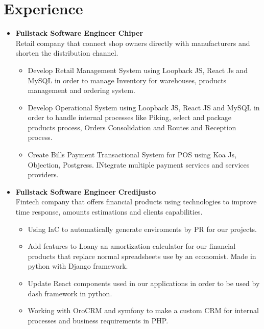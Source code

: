 \documentclass[]{friggeri-cv}
\renewenvironment{entrylist}{%
  \begin{itemize}[leftmargin=0.25in,align=left,itemindent=-\dimexpr\labelindent\relax]
}{%
  \end{itemize}
}
\renewcommand{\entry}[4]{%
  \item[#1] 
    \textbf{#2}%
    \hfill%
    {\footnotesize\textbf{\addfontfeature{Color=pblue} #3 }}\\%
    #4\vspace{\parsep}%
  }
\begin{document}
\section{Experience}
\begin{entrylist}


  \entry	
    {09/19 - 03/19}
    {Fullstack Software Engineer}
    {Chiper}
    {Retail company that connect shop owners directly with manufacturers and shorten the distribution channel.\vspace{-1mm}
    \begin{itemize}[label=$•$]
    \addtolength{\itemindent}{-4mm}
    	\item Develop Retail Management System using Loopback JS, React Js and MySQL in order to manage Inventory for warehouses, products management and ordering system.
    	\item Develop Operational System using Loopback JS, React JS and MySQL in order to handle internal processes like Piking, select and package products process, Orders Consolidation and Routes and Reception process.
    	\item Create Bills  Payment Transactional System for POS using Koa Js, Objection, Postgress. INtegrate multiple payment services and services providers.
	\end{itemize}
    } 
    

  \entry	
    {03/19 - 09/19}
    {Fullstack Software Engineer}
    {Credijusto}
    {Fintech company that offers financial products using technologies to improve time response, amounts estimations and clients capabilities.\vspace{-1mm}
    \begin{itemize}[label=$•$]
    \addtolength{\itemindent}{-1mm}
    	\item Using IaC to automatically generate enviroments by PR for our projects.
    	\item  Add features to Loany an amortization calculator for our financial products that replace normal spreadsheets use by an economist. Made in python with Django framework.
    	\item Update React components used in our applications in order to be used by dash framework in python.
    	\item Working with OroCRM and symfony to make a custom CRM for internal processes and business requirements in PHP.
	\end{itemize}
    } 
    

\end{entrylist}
\end{document}

